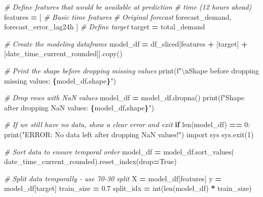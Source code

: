 \documentclass[mstat,12pt]{unswthesis}
\newenvironment{Shaded}{\begin{snugshade}}{\end{snugshade}}
\newcommand{\BuiltInTok}[1]{#1}
\newcommand{\CharTok}[1]{\textcolor[rgb]{0.31,0.60,0.02}{#1}}
\newcommand{\CommentTok}[1]{\textcolor[rgb]{0.56,0.35,0.01}{\textit{#1}}}
\newcommand{\ControlFlowTok}[1]{\textcolor[rgb]{0.13,0.29,0.53}{\textbf{#1}}}
\newcommand{\DecValTok}[1]{\textcolor[rgb]{0.00,0.00,0.81}{#1}}
\newcommand{\FloatTok}[1]{\textcolor[rgb]{0.00,0.00,0.81}{#1}}
\newcommand{\ImportTok}[1]{#1}
\newcommand{\NormalTok}[1]{#1}
\newcommand{\OperatorTok}[1]{\textcolor[rgb]{0.81,0.36,0.00}{\textbf{#1}}}
\newcommand{\SpecialCharTok}[1]{\textcolor[rgb]{0.81,0.36,0.00}{\textbf{#1}}}
\newcommand{\SpecialStringTok}[1]{\textcolor[rgb]{0.31,0.60,0.02}{#1}}
\newcommand{\StringTok}[1]{\textcolor[rgb]{0.31,0.60,0.02}{#1}}
\newcommand{\VariableTok}[1]{\textcolor[rgb]{0.00,0.00,0.00}{#1}}
\begin{document}
\begin{Shaded}
\begin{Highlighting}[]
\CommentTok{\# Define features that would be available at prediction }
\CommentTok{\# time (12 hours ahead)}
\NormalTok{features }\OperatorTok{=}\NormalTok{ [}
    \CommentTok{\# Basic time features}
    \CommentTok{\# Original forecast}
    \StringTok{\textquotesingle{}forecast\_demand\textquotesingle{}}\NormalTok{,}
    \StringTok{\textquotesingle{}forecast\_error\_lag24h\textquotesingle{}}
\NormalTok{]}
\CommentTok{\# Define target}
\NormalTok{target }\OperatorTok{=} \StringTok{\textquotesingle{}total\_demand\textquotesingle{}}

\CommentTok{\# Create the modeling dataframe}
\NormalTok{model\_df }\OperatorTok{=}\NormalTok{ df\_sliced[features }\OperatorTok{+}\NormalTok{ [target] }\OperatorTok{+} 
\NormalTok{    [}\StringTok{\textquotesingle{}date\_time\_current\_rounded\textquotesingle{}}\NormalTok{]].copy()}

\CommentTok{\# Print the shape before dropping missing values}
\BuiltInTok{print}\NormalTok{(}\SpecialStringTok{f"}\CharTok{\textbackslash{}n}\SpecialStringTok{Shape before dropping missing values: }\SpecialCharTok{\{}\NormalTok{model\_df}\SpecialCharTok{.}\NormalTok{shape}\SpecialCharTok{\}}\SpecialStringTok{"}\NormalTok{)}

\CommentTok{\# Drop rows with NaN values}
\NormalTok{model\_df }\OperatorTok{=}\NormalTok{ model\_df.dropna()}
\BuiltInTok{print}\NormalTok{(}\SpecialStringTok{f"Shape after dropping NaN values: }\SpecialCharTok{\{}\NormalTok{model\_df}\SpecialCharTok{.}\NormalTok{shape}\SpecialCharTok{\}}\SpecialStringTok{"}\NormalTok{)}

\CommentTok{\# If we still have no data, show a clear error and exit}
\ControlFlowTok{if} \BuiltInTok{len}\NormalTok{(model\_df) }\OperatorTok{==} \DecValTok{0}\NormalTok{:}
    \BuiltInTok{print}\NormalTok{(}\StringTok{"ERROR: No data left after dropping NaN values!"}\NormalTok{)}
    \ImportTok{import}\NormalTok{ sys}
\NormalTok{    sys.exit(}\DecValTok{1}\NormalTok{)}

\CommentTok{\# Sort data to ensure temporal order}
\NormalTok{model\_df }\OperatorTok{=}\NormalTok{ model\_df.sort\_values(}
      \StringTok{\textquotesingle{}date\_time\_current\_rounded\textquotesingle{}}\NormalTok{).reset\_index(drop}\OperatorTok{=}\VariableTok{True}\NormalTok{)}

\CommentTok{\# Split data temporally {-} use 70{-}30 split}
\NormalTok{X }\OperatorTok{=}\NormalTok{ model\_df[features]}
\NormalTok{y }\OperatorTok{=}\NormalTok{ model\_df[target]}
\NormalTok{train\_size }\OperatorTok{=} \FloatTok{0.7}
\NormalTok{split\_idx }\OperatorTok{=} \BuiltInTok{int}\NormalTok{(}\BuiltInTok{len}\NormalTok{(model\_df) }\OperatorTok{*}\NormalTok{ train\_size)}


\end{Highlighting}
\end{Shaded}
\end{document}
